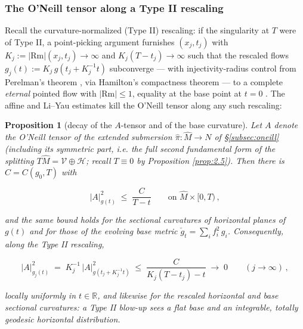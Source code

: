 \documentclass[11pt]{amsart}
\theoremstyle{plain}
\numberwithin{equation}{section}
\newtheorem{proposition}[theorem]{Proposition}
\theoremstyle{definition}
\theoremstyle{remark}
\begin{document}
\subsubsection{The O'Neill tensor along a Type II rescaling}\label{subsec:A-typeII}

Recall the curvature-normalized (Type II) rescaling: if the singularity at $T$ were of Type II, a point-picking argument furnishes $( x_j, t_j )$ with $K_j := | \mathrm{Rm} | ( x_j, t_j ) \to \infty$ and $K_j ( T - t_j ) \to \infty$ such that the rescaled flows $g_j ( t ) := K_j\, g ( t_j + K_j^{-1} t )$ subconverge --- with injectivity-radius control from Perelman's theorem \cite{Perelman}, via Hamilton's compactness theorem \cite{HamCompact} --- to a complete \emph{eternal} pointed flow with $| \mathrm{Rm} | \leq 1$, equality at the base point at $t = 0$ \cite{HamSurvey}. The affine and Li--Yau estimates kill the O'Neill tensor along any such rescaling:

\begin{proposition}[decay of the $A$-tensor and of the base curvature]\label{prop:A-decay-typeII}
	Let $A$ denote the O'Neill tensor of the extended submersion $\widehat{\pi} : \widehat{M} \to N$ of \S\ref{subsec:oneill} (including its symmetric part, i.e. the full second fundamental form of the splitting $T\widehat{M} = \mathcal{V} \oplus \mathcal{H}$; recall $T \equiv 0$ by Proposition \ref{prop:2.5}). Then there is $C = C ( g_0, T )$ with
	
	\begin{equation}\label{eq:A-decay-two-bolt}
		\big| A \big|^2_{g(t)} \;\leq\; \frac{C}{T - t} \qquad \text{on } \widehat{M} \times [0, T) \,,
	\end{equation}
	
	and the same bound holds for the sectional curvatures of horizontal planes of $g(t)$ and for those of the evolving base metric $\check{g}_t = \sum_i f_i^2\, g_i$. Consequently, along the Type II rescaling,
	
	\begin{equation}\label{eq:base-decay-two-bolt}
		\big| A \big|^2_{g_j(t)} \;=\; K_j^{-1}\, \big| A \big|^2_{g ( t_j + K_j^{-1} t )} \;\leq\; \frac{C}{K_j ( T - t_j ) - t} \;\longrightarrow\; 0 \qquad ( j \to \infty ) \,,
	\end{equation}
	
	locally uniformly in $t \in \mathbb{R}$, and likewise for the rescaled horizontal and base sectional curvatures: a Type II blow-up sees a flat base and an integrable, totally geodesic horizontal distribution.
	
\end{proposition}
\end{document}
